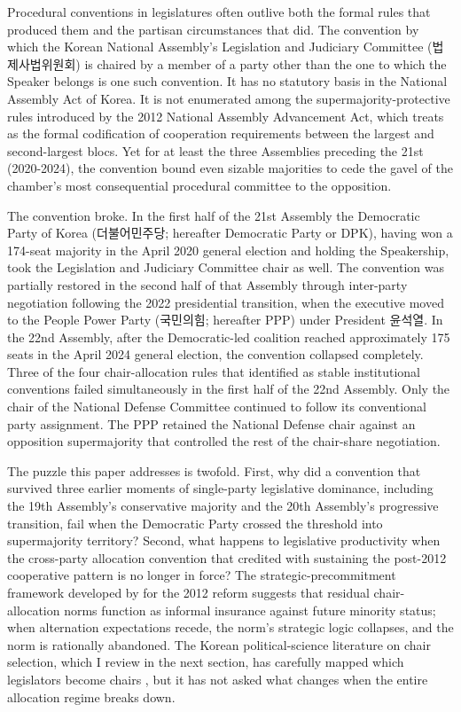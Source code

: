 \documentclass[11pt]{article}
\begin{document}
Procedural conventions in legislatures often outlive both the formal rules that produced them and the partisan circumstances that did. The convention by which the Korean National Assembly's Legislation and Judiciary Committee (법제사법위원회) is chaired by a member of a party other than the one to which the Speaker belongs is one such convention. It has no statutory basis in the National Assembly Act of Korea. It is not enumerated among the supermajority-protective rules introduced by the 2012 National Assembly Advancement Act, which \citet{jeong2023} treats as the formal codification of cooperation requirements between the largest and second-largest blocs. Yet for at least the three Assemblies preceding the 21st (2020-2024), the convention bound even sizable majorities to cede the gavel of the chamber's most consequential procedural committee to the opposition.

The convention broke. In the first half of the 21st Assembly the Democratic Party of Korea (더불어민주당; hereafter Democratic Party or DPK), having won a 174-seat majority in the April 2020 general election and holding the Speakership, took the Legislation and Judiciary Committee chair as well. The convention was partially restored in the second half of that Assembly through inter-party negotiation following the 2022 presidential transition, when the executive moved to the People Power Party (국민의힘; hereafter PPP) under President 윤석열. In the 22nd Assembly, after the Democratic-led coalition reached approximately 175 seats in the April 2024 general election, the convention collapsed completely. Three of the four chair-allocation rules that \citet{jung2018} identified as stable institutional conventions failed simultaneously in the first half of the 22nd Assembly. Only the chair of the National Defense Committee continued to follow its conventional party assignment. The PPP retained the National Defense chair against an opposition supermajority that controlled the rest of the chair-share negotiation.

The puzzle this paper addresses is twofold. First, why did a convention that survived three earlier moments of single-party legislative dominance, including the 19th Assembly's conservative majority and the 20th Assembly's progressive transition, fail when the Democratic Party crossed the threshold into supermajority territory? Second, what happens to legislative productivity when the cross-party allocation convention that \citet{yunan2018} credited with sustaining the post-2012 cooperative pattern is no longer in force? The strategic-precommitment framework developed by \citet{jeong2023} for the 2012 reform suggests that residual chair-allocation norms function as informal insurance against future minority status; when alternation expectations recede, the norm's strategic logic collapses, and the norm is rationally abandoned. The Korean political-science literature on chair selection, which I review in the next section, has carefully mapped which legislators become chairs \citep{kang2023, kang2024}, but it has not asked what changes when the entire allocation regime breaks down.
\end{document}
